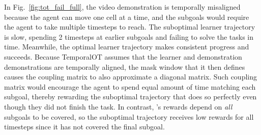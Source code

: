 
In Fig.~\ref{fig:tot_fail_full}, the video demonstration is temporally misaligned because the agent can move one cell at a time, and the subgoals would require the agent to take multiple timesteps to reach. The suboptimal learner trajectory is slow, spending 2 timesteps at earlier subgoals and failing to solve the tasks in time. Meanwhile, the optimal learner trajectory makes consistent progress and succeeds. Because TemporalOT assumes that the learner and demonstration demonstrations are temporally aligned, the mask window that it then defines causes the coupling matrix to also approximate a diagonal matrix. Such coupling matrix would encourage the agent to spend equal amount of time matching each subgoal, thereby rewarding the suboptimal trajectory that does so perfectly even though they did not finish the task. In contrast, \orca{}'s rewards depend on \emph{all} subgoals to be covered, so the suboptimal trajectory receives low rewards for all timesteps since it has not covered the final subgoal.







